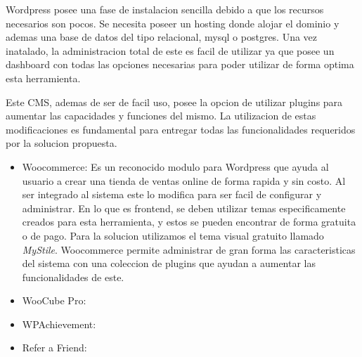 Wordpress posee una fase de instalacion sencilla debido a que los recursos necesarios son pocos. Se 
necesita poseer un hosting donde alojar el dominio y ademas una base de datos del tipo relacional, mysql
o postgres. Una vez inatalado, la administracion total de este es facil de utilizar ya que posee un
dashboard con todas las opciones necesarias para poder utilizar de forma optima esta herramienta. 

Este CMS, ademas de ser de facil uso, posee la opcion de utilizar plugins para aumentar las capacidades y
funciones del mismo. La utilizacion de estas modificaciones es fundamental para entregar todas las
funcionalidades requeridos por la solucion propuesta.

\begin{itemize}

\item Woocommerce: Es un reconocido modulo para Wordpress que ayuda al usuario a crear una tienda de ventas 
online de forma rapida y sin costo. Al ser integrado al sistema este lo modifica para ser facil de configurar
y administrar. En lo que es frontend, se deben utilizar temas especificamente creados para esta herramienta, y 
estos se pueden encontrar de forma gratuita o de pago. Para la solucion utilizamos el tema visual gratuito llamado
\emph{MyStile}. Woocommerce permite administrar de gran forma las caracteristicas del sistema con una coleccion
de plugins que ayudan a aumentar las funcionalidades de este. 

\item WooCube Pro:

\item WPAchievement:

\item Refer a Friend:

\end{itemize}
 
























